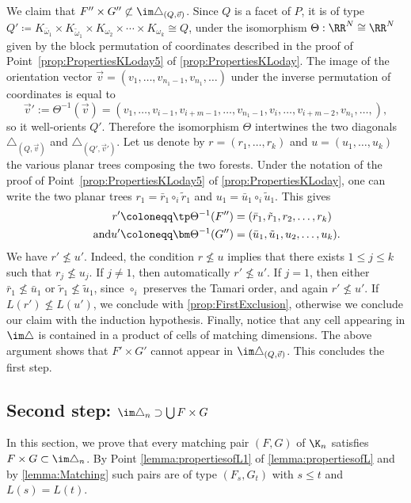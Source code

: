 We claim that ${F''}\times {G''}\not\subset \im\triangle_{(Q,\vec v)}$.
Since $Q$ is a facet of $P$, it is of type
$Q'\coloneqq K_{\bar \omega_1}\times K_{\tilde \omega_1}\times K_{\omega_2} \times \cdots \times K_{\omega_k}\cong Q$,
under the isomorphism $\Theta : \RR^N \cong \RR^N$ given by the block permutation of coordinates described in the proof of Point~\eqref{prop:PropertiesKLoday5} of \cref{prop:PropertiesKLoday}. The image of the orientation vector $\vec v=(v_1, \ldots, v_{n_1-1}, v_{n_1}, \ldots)$
under the inverse permutation of coordinates is equal to
\[\vec v':=\Theta^{-1}(\vec v)=(v_1, \ldots, v_{i-1}, v_{i+m-1}, \ldots, v_{n_1-1}, v_i, \ldots, v_{i+m-2}, v_{n_1}, \ldots, ),\]
so it well-orients $Q'$.
Therefore the isomorphism $\Theta$ intertwines the two diagonals $\triangle_{(Q,\vec v)}$ and $\triangle_{(Q',\vec v')}$. Let us denote by $r=(r_1, \ldots, r_k)$ and $u=(u_1, \ldots, u_k)$ the various planar trees composing the two forests. Under the notation of the proof of
Point~\eqref{prop:PropertiesKLoday5} of \cref{prop:PropertiesKLoday},
one can write the two planar trees
$r_1=\bar r_1\circ_i \tilde r_1$ and $u_1=\bar u_1\circ_i \tilde u_1$. This gives
\begin{align*}
r'&\coloneqq \tp \Theta^{-1}(F'')=(\bar r_1, \tilde r_1, r_2, \ldots, r_k)\\
\tag*{and} u' &\coloneqq \bm \Theta^{-1}(G'')=(\bar u_1, \tilde u_1, u_2, \ldots, u_k).
\end{align*}
We have $r'\not\leq u'$. Indeed, the condition $r\not \leq u$ implies that there exists $1\leq j\leq k$ such that $r_j \not \leq u_j$. If $j\neq 1$, then automatically $r'\not\leq u'$. If $j=1$, then either $\bar r_1 \not \leq \bar u_1$ or
$\tilde r_1 \not \leq \tilde u_1$, since $\circ_i$ preserves the Tamari order, and again $r'\not\leq u'$.
If $L(r')\not\leq L(u')$,
we conclude with \cref{prop:FirstExclusion}, otherwise we conclude our claim with the induction hypothesis.
Finally, notice that any cell appearing in $\im \triangle$ is contained in a product of cells of matching dimensions. The above argument shows that $F'\times G'$ cannot appear in $\im \triangle_{(Q,\vec v)}$. This concludes the first step.

\subsection{Second step: $\im\triangle_n\supset \bigcup F\times G$}
In this section, we prove that every matching pair $(F, G)$ of $\K_n$ satisfies $F\times G\subset \im\triangle_n$.
By Point \eqref{lemma:propertiesofL1} of \cref{lemma:propertiesofL} and by \cref{lemma:Matching} such pairs are of type
$(F_s, G_t)$ with $s\leq t$ and $L(s)=L(t)$.

